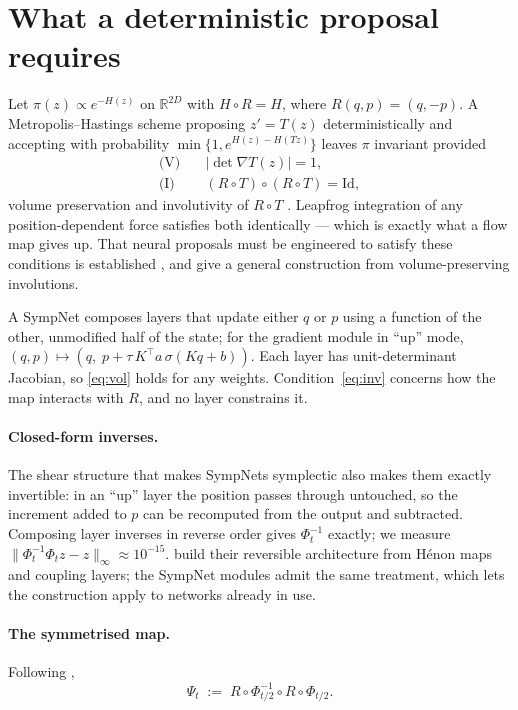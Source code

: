 \documentclass[mlabstract,onecolumn]{jmlr}
\def\R{\mathbb{R}}
\newcommand{\Ham}{H}
\newcommand{\flip}{R}
\begin{document}
\section{What a deterministic proposal requires}

Let $\pi(z) \propto e^{-\Ham(z)}$ on $\R^{2D}$ with $\Ham \circ \flip = \Ham$,
where $\flip(q,p) = (q,-p)$. A Metropolis--Hastings scheme proposing $z' = T(z)$
deterministically and accepting with probability
$\min\{1, e^{\Ham(z) - \Ham(Tz)}\}$ leaves $\pi$ invariant provided
\begin{align}
    \text{(V)} \quad & |\det \nabla T(z)| = 1, \label{eq:vol}\\
    \text{(I)} \quad & (\flip \circ T) \circ (\flip \circ T) = \mathrm{Id},
    \label{eq:inv}
\end{align}
volume preservation and involutivity of $\flip \circ T$
\citep{Green1995,Tierney1998}. Leapfrog integration of any position-dependent
force satisfies both identically --- which is exactly what a flow map gives up.
That neural proposals must be engineered to satisfy these conditions is
established \citep{song2017nice,levy2018generalizing}, and
\citet{spanbauer2020involutive} give a general construction from
volume-preserving involutions.

A SympNet composes layers that update either $q$ or $p$ using a function of the
other, unmodified half of the state; for the gradient module in ``up'' mode,
$(q,p) \mapsto (q,\; p + \tau\, K^{\!\top} a\, \sigma(Kq + b))$. Each layer has
unit-determinant Jacobian, so \eqref{eq:vol} holds for any weights.
Condition~\eqref{eq:inv} concerns how the map interacts with $\flip$, and no
layer constrains it.

\paragraph{Closed-form inverses.} The shear structure that makes SympNets
symplectic also makes them exactly invertible: in an ``up'' layer the position
passes through untouched, so the increment added to $p$ can be recomputed from
the output and subtracted. Composing layer inverses in reverse order gives
$\Phi_t^{-1}$ exactly; we measure
$\|\Phi_t^{-1}\Phi_t z - z\|_\infty \approx 10^{-15}$.
\citet{valperga2022reversible} build their reversible architecture from
H\'enon maps and coupling layers; the SympNet modules admit the same treatment,
which lets the construction apply to networks already in use.

\paragraph{The symmetrised map.} Following \citet{valperga2022reversible},
\begin{equation}
    \Psi_t \;:=\; \flip \circ \Phi_{t/2}^{-1} \circ \flip \circ \Phi_{t/2}.
    \label{eq:psi}
\end{equation}
\end{document}

